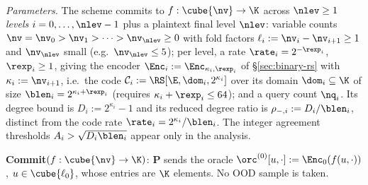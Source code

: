 \begin{protocol}\label{fig:protocol}
\ \par\smallskip
\emph{Parameters.} The scheme commits to $f : \cube{\nv} \to \K$ across $\nlev \ge 1$ \emph{levels} $i = 0, \dots, \nlev-1$ plus a plaintext final level $\nlev$: variable counts $\nv = \nv_0 > \nv_1 > \dots > \nv_\nlev \ge 0$ with fold factors $\ell_i := \nv_i - \nv_{i+1} \ge 1$ and $\nv_\nlev$ small (e.g.\ $\nv_\nlev \le 5$); per level, a rate $\rate_i = 2^{-\rexp_i}$, $\rexp_i \ge 1$, giving the encoder $\Enc_i := \Enc_{\kappa_i, \rexp_i}$ of \S\ref{sec:binary-rs} with $\kappa_i := \nv_{i+1}$, i.e.\ the code $\mathcal{C}_i := \RS[\E, \dom_i, 2^{\kappa_i}]$ over its domain $\dom_i \subseteq \K$ of size $\blen_i = 2^{\kappa_i + \rexp_i}$ (requires $\kappa_i + \rexp_i \le 64$); and a query count $\nq_i$. Its degree bound is $D_i:=2^{\kappa_i}-1$ and its reduced degree ratio is $\rho_{-,i}:=D_i/\blen_i$, distinct from the code rate $\rate_i=2^{\kappa_i}/\blen_i$. The integer agreement thresholds $A_i>\sqrt{D_i\blen_i}$ appear only in the analysis.

\smallskip
\textbf{Commit}$(f : \cube{\nv} \to \K)$: $\mathbf{P}$ sends the oracle $\orc^{(0)}[u, \cdot] := \Enc_0(f(u, \cdot))$, $u \in \cube{\ell_0}$, whose entries are $\K$ elements. No OOD sample is taken.


\end{protocol}
